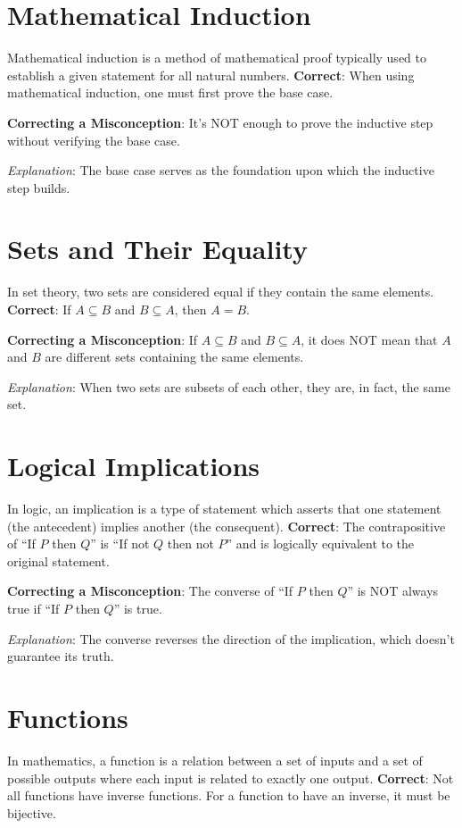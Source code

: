 \documentclass[12pt]{article}
\begin{document}
\section*{Mathematical Induction}
Mathematical induction is a method of mathematical proof typically used to establish a given statement for all natural numbers.
\textbf{Correct}: When using mathematical induction, one must first prove the base case.

\textbf{Correcting a Misconception}: It's NOT enough to prove the inductive step without verifying the base case.

\textit{Explanation}: The base case serves as the foundation upon which the inductive step builds.

\section*{Sets and Their Equality}
In set theory, two sets are considered equal if they contain the same elements.
\textbf{Correct}: If \(A \subseteq B\) and \(B \subseteq A\), then \(A = B\).

\textbf{Correcting a Misconception}: If \(A \subseteq B\) and \(B \subseteq A\), it does NOT mean that \(A\) and \(B\) are different sets containing the same elements.

\textit{Explanation}: When two sets are subsets of each other, they are, in fact, the same set.

\section*{Logical Implications}
In logic, an implication is a type of statement which asserts that one statement (the antecedent) implies another (the consequent).
\textbf{Correct}: The contrapositive of ``If \(P\) then \(Q\)'' is ``If not \(Q\) then not \(P\)'' and is logically equivalent to the original statement.

\textbf{Correcting a Misconception}: The converse of ``If \(P\) then \(Q\)'' is NOT always true if ``If \(P\) then \(Q\)'' is true.

\textit{Explanation}: The converse reverses the direction of the implication, which doesn't guarantee its truth.

\section*{Functions}
In mathematics, a function is a relation between a set of inputs and a set of possible outputs where each input is related to exactly one output.
\textbf{Correct}: Not all functions have inverse functions. For a function to have an inverse, it must be bijective.
\end{document}
